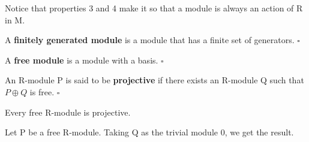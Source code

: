 \documentclass[../category_theory.tex]{subfiles}
\begin{document}
Notice that properties 3 and 4 make it so that a module is always an action of R in M.
\begin{def*}
	A \textbf{finitely generated module} is a module that has a finite set of generators. \(\square\)
\end{def*}
\begin{def*}
	A \textbf{free module} is a module with a basis. \(\square\)
\end{def*}
\begin{def*}
	An R-module P is said to be \textbf{projective} if there exists an R-module Q such that \(P\oplus Q\) is free. \(\square\)
\end{def*}
\begin{prop*}
	Every free R-module is projective.
\end{prop*}
\begin{proof*}
	Let P be a free R-module. Taking Q as the trivial module 0, we get the result. \qedsymbol
\end{proof*}
\end{document}
